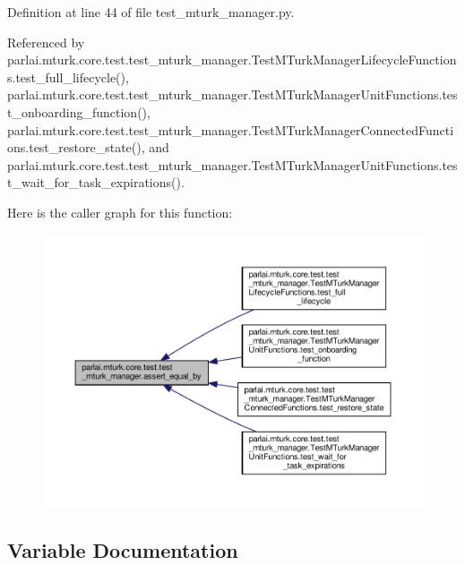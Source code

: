 Definition at line 44 of file test\+\_\+mturk\+\_\+manager.\+py.



Referenced by parlai.\+mturk.\+core.\+test.\+test\+\_\+mturk\+\_\+manager.\+Test\+M\+Turk\+Manager\+Lifecycle\+Functions.\+test\+\_\+full\+\_\+lifecycle(), parlai.\+mturk.\+core.\+test.\+test\+\_\+mturk\+\_\+manager.\+Test\+M\+Turk\+Manager\+Unit\+Functions.\+test\+\_\+onboarding\+\_\+function(), parlai.\+mturk.\+core.\+test.\+test\+\_\+mturk\+\_\+manager.\+Test\+M\+Turk\+Manager\+Connected\+Functions.\+test\+\_\+restore\+\_\+state(), and parlai.\+mturk.\+core.\+test.\+test\+\_\+mturk\+\_\+manager.\+Test\+M\+Turk\+Manager\+Unit\+Functions.\+test\+\_\+wait\+\_\+for\+\_\+task\+\_\+expirations().

Here is the caller graph for this function\+:
\nopagebreak
\begin{figure}[H]
\begin{center}
\leavevmode
\includegraphics[width=350pt]{namespaceparlai_1_1mturk_1_1core_1_1test_1_1test__mturk__manager_a1fd7ac4fedefa65d2416601107dbe44c_icgraph}
\end{center}
\end{figure}


\subsection{Variable Documentation}
\mbox{\label{namespaceparlai_1_1mturk_1_1core_1_1test_1_1test__mturk__manager_a66cdf49dc350e6730b30c25491e06861}} 
